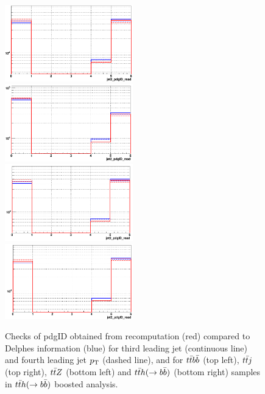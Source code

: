 \documentclass{cernrep}
\begin{document}
\begin{figure}[!htb]\centering
\includegraphics[width=0.495\textwidth]{Fig/check_TRF/tth_boosted/jet34pdgID_ttbb_redModule_blueDELPHES.png}
\includegraphics[width=0.495\textwidth]{Fig/check_TRF/tth_boosted/jet34pdgID_ttj_redModule_blueDELPHES.png}
\includegraphics[width=0.495\textwidth]{Fig/check_TRF/tth_boosted/jet34pdgID_ttz_redModule_blueDELPHES.png}
\includegraphics[width=0.495\textwidth]{Fig/check_TRF/tth_boosted/jet34pdgID_tth_redModule_blueDELPHES.png}
\caption{Checks of pdgID obtained from recomputation (red) compared to Delphes information (blue) for third leading jet (continuous line) and fourth leading jet $p\sb{\scriptstyle\mathrm{T}}$ (dashed line), and for $t\bar{t}b\bar{b}$ (top left), $t\bar{t}j$ (top right), $t\bar{t}Z$ (bottom left) and $t\bar{t}h(\rightarrow b\bar{b})$ (bottom right) samples in $t\bar{t}h(\rightarrow b\bar{b})$ boosted analysis.}
\label{fig:tthboosted_TRFchecks2}
\end{figure}
\end{document}
